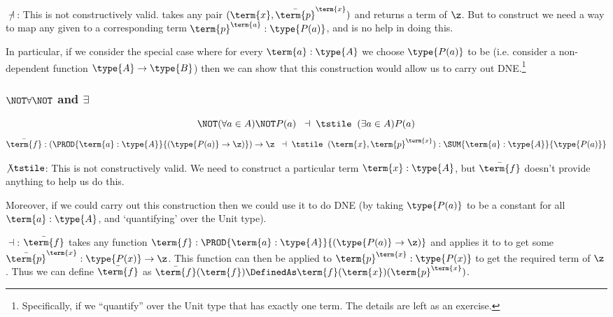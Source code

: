 $\not\dashv$:  This is not constructively valid.
 takes any pair $(\term{x},\bar{\term{p}}^{\term{x}})$ and returns a term of $\z$.  But to construct  we need a way to map any given  to a corresponding term $\term{p}^{\term{a}}:\type{P(a)}$, and  is no help in doing this.

In particular, if we consider the special case where for every $\term{a}:\type{A}$ we choose $\type{P(a)}$ to be  (i.e. consider a non-dependent function $\type{A} \to \type{B}$) then we can show that this construction would allow us to carry out DNE.\footnote{
Specifically, if we ``quantify'' over the Unit type  that has exactly one term.  The details are left as an exercise.}





\subsubsection{$\NOT\forall\NOT$ and $\exists$}

\[
\NOT(\forall a \in A) \NOT P(a)
\;\; \dashv \; \tstile 	\;\; 
(\exists a \in A) P(a)
\]
\[
\bar{\term{f}}:
\left(
\PROD{\term{a}:\type{A}}
{(\type{P(a)} \to \z)}
\right) \to \z
	\;\; \dashv \; \tstile 	\;\; 
(\term{x}, \term{p}^{\term{x}}):
\SUM{\term{a}:\type{A}}
{\type{P(a)}}
\]


$\not\tstile$: This is not constructively valid.  We need to construct a particular term $\term{x}:\type{A}$, but $\bar{\term{f}}$ doesn't provide anything to help us do this.

Moreover, if we could carry out this construction then we could use it to do DNE (by taking ${\type{P(a)}}$ to be a constant  for all $\term{a}:\type{A}$, and `quantifying' over the Unit type). 

$\dashv$:  $\bar{\term{f}}$ takes any function 
$\term{f}:\PROD{\term{a}:\type{A}}
{(\type{P(a)} \to \z)}$
and applies it to  to get some 
$\bar{\term{p}}^{\term{x}}:{\type{P(x)} \to \z}$.  This function can then be applied to $\term{p}^{\term{x}}:\type{P(x)}$ to get the required term of $\z$.  Thus we can define $\bar{\term{f}}$ as
$\bar{\term{f}}(\term{f}) \DefinedAs
\term{f}(\term{x})(\term{p}^{\term{x}})$.




